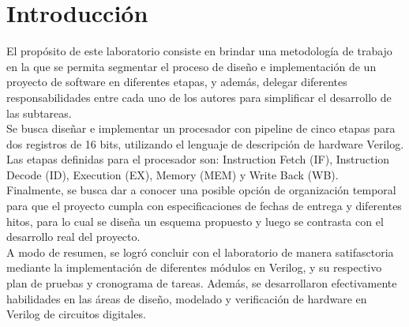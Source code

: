 \section{Introducci\' on}

El prop\' osito de este laboratorio consiste en brindar una metodolog\' ia de trabajo en la que se permita segmentar el proceso de dise\~ no e implementaci\' on de un proyecto de software en diferentes etapas, y adem\' as, delegar diferentes responsabilidades entre cada uno de los autores para simplificar el desarrollo de las subtareas.\\

Se busca dise\~ nar e implementar un procesador con pipeline de cinco etapas para dos registros de 16 bits, utilizando el lenguaje de descripci\' on de hardware Verilog. Las etapas definidas para el procesador son: Instruction Fetch (IF), Instruction Decode (ID), Execution (EX), Memory (MEM) y Write Back (WB).\\

Finalmente, se busca dar a conocer una posible opci\' on de organizaci\' on temporal para que el proyecto cumpla con especificaciones de fechas de entrega y diferentes hitos, para lo cual se dise\~ na un esquema propuesto y luego se contrasta con el desarrollo real del proyecto. \\

A modo de resumen, se logr\' o concluir con el laboratorio de manera satifasctoria mediante la implementaci\' on de diferentes m\' odulos en Verilog, y su respectivo plan de pruebas y cronograma de tareas. Adem\' as, se desarrollaron efectivamente habilidades en las \' areas de dise\~ no, modelado y verificaci\' on de hardware en Verilog de circuitos digitales.\\ 

\setcounter{secnumdepth}{4}
